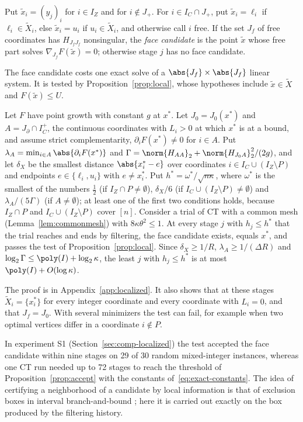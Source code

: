 \begin{definition}\label{def:facecand}
Put $\tilde x_i=(y_j)_i$ for $i\in I_Z$ and for $i\notin J_+$. For
$i\in I_C\cap J_+$, put $\tilde x_i=\ell_i$ if $\ell_i\in\tilde X_i$, else
$\tilde x_i=u_i$ if $u_i\in\tilde X_i$, and otherwise call $i$ free. If the
set $J_f$ of free coordinates has $H_{J_fJ_f}$ nonsingular, the \emph{face
candidate} is the point $\tilde x$ whose free part solves
$\nabla_{J_f}F(\tilde x)=0$; otherwise stage $j$ has no face candidate.
\end{definition}

The face candidate costs one exact solve of a $\abs{J_f}\times\abs{J_f}$ linear
system. It is tested by Proposition~\ref{prop:local}, whose hypotheses
include $\tilde x\in\tilde X$ and $F(\tilde x)\le U$.

\begin{corollary}\label{cor:local}
Let $F$ have point growth with constant $g$ at $x^*$. Let $J_0=J_0(x^*)$ and
$A=J_\partial\cap I_C^+$, the continuous coordinates with $L_i>0$ at which
$x^*$ is at a bound, and assume strict complementarity,
$\partial_iF(x^*)\ne0$ for $i\in A$. Put
$\lambda_A=\min_{i\in A}\abs{\partial_iF(x^*)}$ and
$\Gamma=\norm{H_{AA}}_2+\norm{H_{J_0A}}_2^2/(2g)$,
and let $\delta_X$ be the smallest distance $\abs{x^*_i-e}$ over coordinates
$i\in I_C\cup(I_Z\setminus P)$ and endpoints $e\in\{\ell_i,u_i\}$ with
$e\ne x^*_i$. Put $h^*=\omega^*/\sqrt{n\kappa}$, where $\omega^*$ is the
smallest of the numbers $\frac12$ (if $I_Z\cap P\ne\emptyset$), $\delta_X/6$
(if $I_C\cup(I_Z\setminus P)\ne\emptyset$) and $\lambda_A/(5\Gamma)$ (if
$A\ne\emptyset$); at least one of the first two conditions holds, because
$I_Z\cap P$ and $I_C\cup(I_Z\setminus P)$ cover $[n]$. Consider a trial
of CT with a common mesh (Lemma~\ref{lem:commonmesh}) with
$8\kappa\theta^2\le1$. At every stage $j$ with $h_j\le h^*$ that the trial
reaches and ends by filtering, the face candidate exists, equals $x^*$, and
passes the test of Proposition~\ref{prop:local}. Since $\delta_X\ge1/R$,
$\lambda_A\ge1/(\Delta R)$ and $\log_2\Gamma\le\poly(I)+\log_2\kappa$, the
least $j$ with $h_j\le h^*$ is at most $\poly(I)+O(\log\kappa)$.
\end{corollary}

The proof is in Appendix~\ref{app:localized}. It also shows that at these
stages $\tilde X_i=\{x^*_i\}$ for every integer coordinate and every
coordinate with $L_i=0$, and that $J_f=J_0$. With several minimizers the test
can fail, for example when two optimal vertices differ in a coordinate
$i\notin P$.

In experiment S1 (Section~\ref{sec:comp-localized}) the test accepted the
face candidate within nine stages on 29 of 30 random mixed-integer instances,
whereas one CT run needed up to 72 stages to reach the threshold of
Proposition~\ref{prop:accept} with the constants
of~\eqref{eq:exact-constants}. The idea of certifying a neighborhood of a
candidate by local information is that of exclusion boxes in interval
branch-and-bound \cite{Neumaier2004}; here it is carried out exactly on the
box produced by the filtering history.
